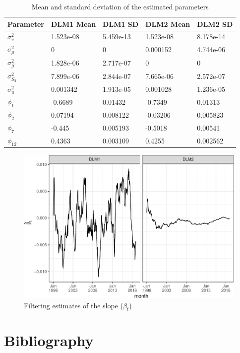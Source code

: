 \documentclass[]{article}
\begin{document}
\begin{table}[t]

\caption{\label{tab:par-comparison}Mean and standard deviation of the estimated parameters}
\centering
\begin{tabular}{lllll}
\toprule
Parameter & DLM1 Mean & DLM1 SD & DLM2 Mean & DLM2 SD\\
\midrule
$\sigma_{v}^{2}$ & 1.523e-08 & 5.459e-13 & 1.523e-08 & 8.178e-14\\
$\sigma_{\mu}^{2}$ & 0 & 0 & 0.000152 & 4.744e-06\\
$\sigma_{\beta}^{2}$ & 1.828e-06 & 2.717e-07 & 0 & 0\\
$\sigma_{S_{2}}^{2}$ & 7.899e-06 & 2.844e-07 & 7.665e-06 & 2.572e-07\\
$\sigma^{2}_{u}$ & 0.001342 & 1.913e-05 & 0.001028 & 1.236e-05\\
\addlinespace
$\phi_{1}$ & -0.6689 & 0.01432 & -0.7349 & 0.01313\\
$\phi_{2}$ & 0.07194 & 0.008122 & -0.03206 & 0.005823\\
$\phi_{7}$ & -0.445 & 0.005193 & -0.5018 & 0.00541\\
$\phi_{12}$ & 0.4363 & 0.003109 & 0.4255 & 0.002562\\
\bottomrule
\end{tabular}
\end{table}

\begin{figure}
\centering
\includegraphics{../figs/freq--trend-growth-1.pdf}
\caption{\label{fig:trend-growth}Filtering estimates of the slope
(\(\beta_t\))}
\end{figure}

\section*{Bibliography}\label{bibliography}
\end{document}
